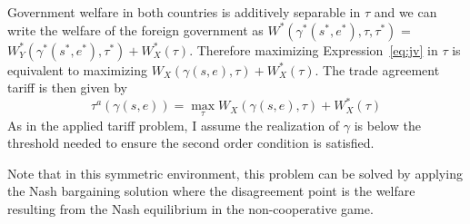 \documentclass[12pt]{article}
\newcommand{\ga}{\gamma}
\begin{document}
Government welfare in both countries is additively separable in $\tau$ and we can write the welfare of the foreign government as $W^*(\ga^*(s^*,e^*),\tau,\tau^*)$ = $W_Y^*(\ga^*(s^*,e^*),\tau^*) + W_X^*(\tau)$. Therefore maximizing Expression~\ref{eq:jv} in $\tau$ is equivalent to maximizing $W_X(\ga(s,e),\tau) + W_X^*(\tau)$. The trade agreement tariff is then given by
\begin{equation}
  \tau^a(\ga(s,e)) = \max_\tau W_X(\ga(s,e),\tau) + W_X^*(\tau)
  \label{eq:eff}
\end{equation}
As in the applied tariff problem, I assume the realization of $\ga$ is below the threshold needed to ensure the second order condition is satisfied.

Note that in this symmetric environment, this problem can be solved by applying the Nash bargaining solution where the disagreement point is the welfare resulting from the Nash equilibrium in the non-cooperative game.
\end{document}
